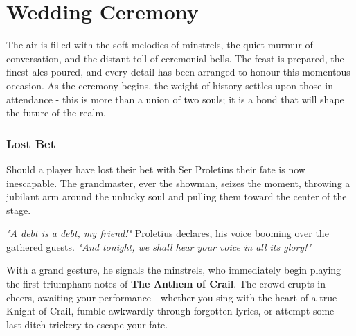 \chapter*{Wedding Ceremony}

{\entryfont The air is filled with the soft melodies of minstrels, the quiet murmur of conversation, and the distant toll of ceremonial bells. The feast is prepared, the finest ales poured, and every detail has been arranged to honour this momentous occasion. As the ceremony begins, the weight of history settles upon those in attendance - this is more than a union of two souls; it is a bond that will shape the future of the realm.}

\subsection*{Lost Bet}
{\entryfont Should a player have lost their bet with Ser Proletius their fate is now inescapable. The grandmaster, ever the showman, seizes the moment, throwing a jubilant arm around the unlucky soul and pulling them toward the center of the stage.}
\begin{DndReadAloud}
	\textit{"A debt is a debt, my friend!"} Proletius declares, his voice booming over the gathered guests. \textit{"And tonight, we shall hear your voice in all its glory!"}

	With a grand gesture, he signals the minstrels, who immediately begin playing the first triumphant notes of \textbf{The Anthem of Crail}. The crowd erupts in cheers, awaiting your performance - whether you sing with the heart of a true Knight of Crail, fumble awkwardly through forgotten lyrics, or attempt some last-ditch trickery to escape your fate.
\end{DndReadAloud}

